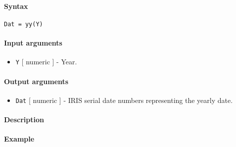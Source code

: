 


	\paragraph{Syntax}\label{syntax}

\begin{verbatim}
Dat = yy(Y)
\end{verbatim}

\paragraph{Input arguments}\label{input-arguments}

\begin{itemize}
\itemsep1pt\parskip0pt
\item
  \texttt{Y} {[} numeric {]} - Year.
\end{itemize}

\paragraph{Output arguments}\label{output-arguments}

\begin{itemize}
\itemsep1pt\parskip0pt
\item
  \texttt{Dat} {[} numeric {]} - IRIS serial date numbers representing
  the yearly date.
\end{itemize}

\paragraph{Description}\label{description}

\paragraph{Example}\label{example}


